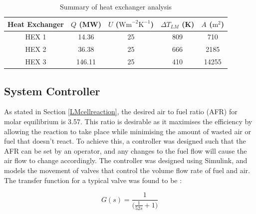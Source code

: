 \documentclass{article}
\begin{document}

\begin{table}[h!]
\centering
\caption{Summary of heat exchanger analysis}
\label{my-label}
\begin{tabular}{|c|c|c|c|c|}
\hline
\textbf{Heat Exchanger} & \textbf{$Q$ (MW)} & \textbf{$U$ ($\text{Wm}^{-2} \text{K}^{-1}$)} & \textbf{$\Delta T_{LM}$ (K)} & \textbf{$A$ ($\text{m}^{2}$)} \\ \hline
HEX 1                   & 14.36           & 25                   & 809                     & 710             \\ \hline
HEX 2                   & 36.38           & 25                   & 666                     & 2185            \\ \hline
HEX 3                   & 146.11          & 25                   & 410                     & 14255           \\ \hline
\end{tabular}
\end{table}



\subsection{System Controller}

As stated in Section \ref{LMcellreaction}, the desired air to fuel ratio (AFR) for molar equilibrium is 3.57. This ratio is desirable as it maximises the efficiency by allowing the reaction to take place while minimising the amount of wasted air or fuel that doesn't react. To achieve this, a controller was designed such that the AFR can be set by an operator, and any changes to the fuel flow will cause the air flow to change accordingly. The controller was designed using Simulink, and models the movement of valves that control the volume flow rate of fuel and air.
The transfer function for a typical valve was found to be \cite{LM17}:

\begin{equation}
G(s) = \frac{1}{\Big (\frac{1}{52s}+1 \Big )}						
\end{equation}
\end{document}
